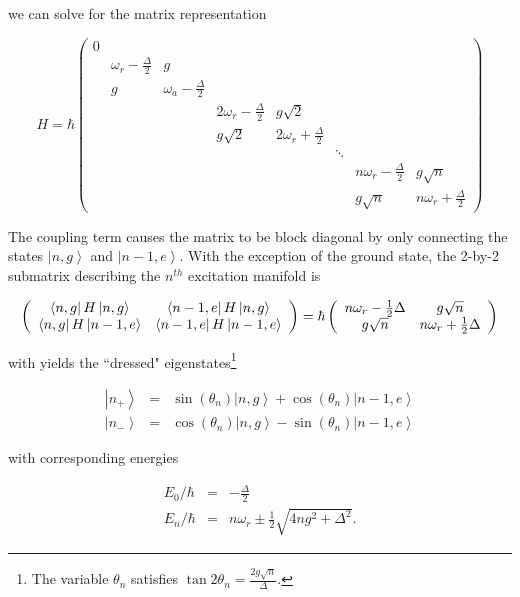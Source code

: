\documentclass[11 pt, oneside]{book} %
\newcommand{\ket}[1]{\left| #1 \right>} %
\newcommand{\matrixel}[3]{\left< #1 \vphantom{#2#3} \right|
 #2 \left| #3 \vphantom{#1#2} \right>} %
\begin{document}
we can solve for the matrix representation

\begin{equation}\label{eq:Matrix}
H =  \hbar\left(\begin{array}{cccccccc}
0 \\
& \omega_r-\frac{\Delta}{2}	& g \\
& g    		& \omega_a-\frac{\Delta}{2} \\
&&&2\omega_r-\frac{\Delta}{2}	 & g\sqrt{2} \\
&&&g\sqrt{2}		& 2\omega_r + \frac{\Delta}{2}\\
&&&&&\ddots\\
&&&&&&n\omega_r-\frac{\Delta}{2} & g\sqrt{n}\\
&&&&&&g\sqrt{n}    & n\omega_r+\frac{\Delta}{2}
\end{array} \right)
\end{equation}

The coupling term causes the matrix to be block diagonal by only connecting the states $\ket{n,g}$ and $\ket{n-1,e}$. With the exception of the ground state, the 2-by-2 submatrix describing the $n^{th}$ excitation manifold is

\begin{equation}
\left(\begin{array}{cc}
\matrixel{n,g}{H}{n,g} & \matrixel{n-1,e}{H}{n,g} \\
\matrixel{n,g}{H}{n-1,e} & \matrixel{n-1,e}{H}{n-1,e}
\end{array}\right) = \hbar \left(\begin{array}{cc}
n\omega_r-\frac{1}{2}\Delta 	& g\sqrt{n} \\
 g\sqrt{n}					& n\omega_r+\frac{1}{2}\Delta
\end{array}\right)
\end{equation}

with yields the ``dressed" eigenstates\footnote{The variable $\theta_n$ satisfies $\tan{2\theta_n}=\frac{2g\sqrt{n}}{\Delta}$.} 

\begin{eqnarray}
\ket{n_+} &=& \sin(\theta_n)\ket{n,g}+\cos(\theta_n)\ket{n-1,e} \\
\ket{n_-} &=& \cos(\theta_n)\ket{n,g}-\sin(\theta_n)\ket{n-1,e}
\end{eqnarray}

with corresponding energies

\begin{eqnarray}
E_0/\hbar &=& -\frac{\Delta}{2} \\
E_n/\hbar &=& n\omega_r \pm \frac{1}{2}\sqrt{4ng^2+\Delta^2} .\nonumber
\end{eqnarray}
\end{document}
